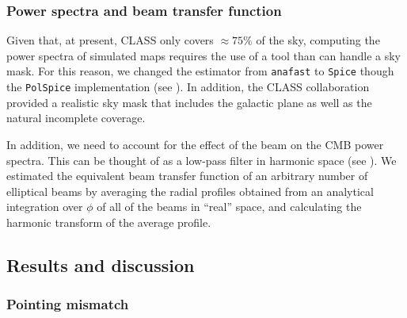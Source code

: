 \documentclass[a4paper,11pt]{article}
\begin{document}

\subsubsection{Power spectra and beam transfer function}

Given that, at present, CLASS only covers $\approx 75\%$ of the sky, computing the power spectra of simulated maps requires the use of a tool than can handle a sky mask. For this reason, we changed the estimator from \texttt{anafast} to \texttt{Spice} though the \texttt{PolSpice} implementation (see \cite{2004MNRAS.350..914C}). In addition, the CLASS collaboration provided a realistic sky mask that includes the galactic plane as well as the natural incomplete coverage. 

In addition, we need to account for the effect of the beam on the CMB power spectra. This can be thought of as a low-pass filter in harmonic space (see \cite{2003ApJS..148...39P}). We estimated the equivalent beam transfer function of an arbitrary number of elliptical beams by averaging the radial profiles obtained from an analytical integration over $\phi$ of all of the beams in ``real'' space,  and calculating the harmonic transform of the average profile.

\subsection{Results and discussion}

\subsubsection{Pointing mismatch}
\end{document}
